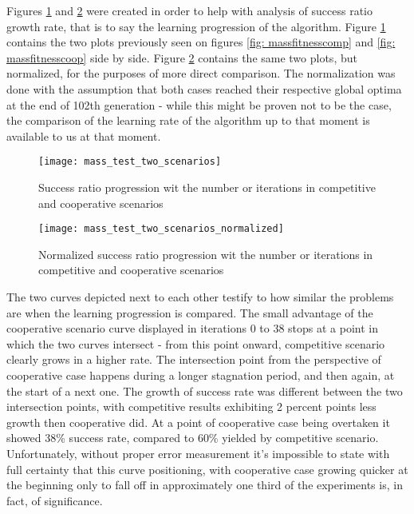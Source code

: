 Figures \ref{fig:x mass_test_two_scenarios} and \ref{fig:x mass_test_two_scenarios_normalized} were created in order to help with analysis of success ratio growth rate, that is to say the learning progression of the algorithm. Figure \ref{fig:x mass_test_two_scenarios} contains the two plots previously seen on figures \ref{fig: massfitnesscomp} and \ref{fig: massfitnesscoop} side by side. Figure \ref{fig:x mass_test_two_scenarios_normalized} contains the same two plots, but normalized, for the purposes of more direct comparison. The normalization was done with the assumption that both cases reached their respective global optima at the end of 102th generation - while this might be proven not to be the case, the comparison of the learning rate of the algorithm up to that moment is available to us at that moment.
\begin{figure}[h]
    \centering
    \texttt{[image: mass\_test\_two\_scenarios]}
    \caption{Success ratio progression wit the number or iterations in competitive and cooperative scenarios}
    \label{fig:x mass_test_two_scenarios}
\end{figure}

\begin{figure}[h]
    \centering
    \texttt{[image: mass\_test\_two\_scenarios\_normalized]}
    \caption{Normalized success ratio progression wit the number or iterations in competitive and cooperative scenarios}
    \label{fig:x mass_test_two_scenarios_normalized}
\end{figure}

The two curves depicted next to each other testify to how similar the problems are when the learning progression is compared. The small advantage of the cooperative scenario curve displayed in iterations 0 to 38 stops at a point in which the two curves intersect - from this point onward, competitive scenario clearly grows in a higher rate. The intersection point from the perspective of cooperative case happens during a longer stagnation period, and then again, at the start of a next one. The growth of success rate was different between the two intersection points, with competitive results exhibiting 2 percent points less growth then cooperative did. At a point of cooperative case being overtaken it showed 38\% success rate, compared to 60\% yielded by competitive scenario. Unfortunately, without proper error measurement it's impossible to state with full certainty that this curve positioning, with cooperative case growing quicker at the beginning only to fall off in approximately one third of the experiments is, in fact, of significance.

